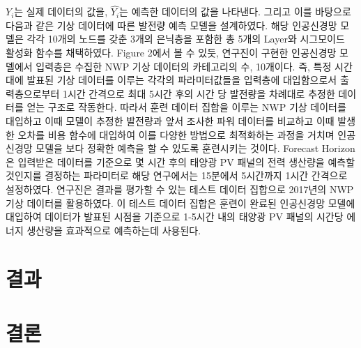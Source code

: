 \documentclass{article}
\begin{document}
$Y_i$는 실제 데이터의 값을, $\hat{Y_i}$는 예측한 데이터의 값을 나타낸다.
그리고 이를 바탕으로 다음과 같은 기상 데이터에 따른 발전량 예측 모델을 설계하였다. 해당 인공신경망 모델은 각각 10개의 노드를 갖춘 3개의 은닉층을 포함한 총 5개의 Layer와 시그모이드 활성화 함수를 채택하였다. Figure 2에서 볼 수 있듯, 연구진이 구현한 인공신경망 모델에서 입력층은 수집한 NWP 기상 데이터의 카테고리의 수, 10개이다. 즉, 특정 시간대에 발표된 기상 데이터를 이루는 각각의 파라미터값들을 입력층에 대입함으로서 출력층으로부터 1시간 간격으로 최대 5시간 후의 시간 당 발전량을 차례대로 추정한 데이터를 얻는 구조로 작동한다. 따라서 훈련 데이터 집합을 이루는 NWP 기상 데이터를 대입하고 이때 모델이 추정한 발전량과 앞서 조사한 파워 데이터를 비교하고 이때 발생한 오차를 비용 함수에 대입하여 이를 다양한 방법으로 최적화하는 과정을 거치며 인공신경망 모델을 보다 정확한 예측을 할 수 있도록 훈련시키는 것이다. Forecast Horizon은 입력받은 데이터를 기준으로 몇 시간 후의 태양광 PV 패널의 전력 생산량을 예측할 것인지를 결정하는 파라미터로 해당 연구에서는 15분에서 5시간까지 1시간 간격으로 설정하였다. 연구진은 결과를 평가할 수 있는 테스트 데이터 집합으로 2017년의 NWP 기상 데이터를 활용하였다. 이 테스트 데이터 집합은 훈련이 완료된 인공신경망 모델에 대입하여 데이터가 발표된 시점을 기준으로 1-5시간 내의 태양광 PV 패널의 시간당 에너지 생산량을 효과적으로 예측하는데 사용된다.

\section{결과}


\section{결론}
\end{document}

